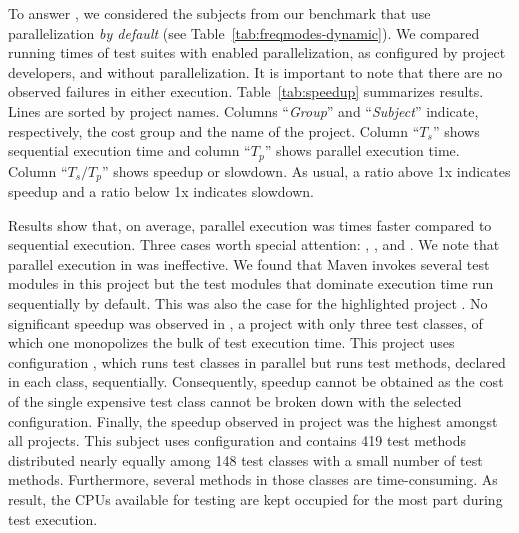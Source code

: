 \documentclass[10pt,journal,compsoc]{IEEEtran}
\begin{document}
To answer \numRQSpeedupOne{}, we considered the \numProjectsPar{}
subjects from our benchmark that use parallelization \emph{by default}
(see Table~\ref{tab:freqmodes-dynamic}).  We compared running times
of test suites with enabled parallelization, as configured by project
developers, and without parallelization. It is important to note that
there are no observed failures in either execution.
Table~\ref{tab:speedup} summarizes results.
Lines are sorted by project names.
Columns ``\emph{Group}'' and ``\emph{Subject}'' indicate, respectively,
the cost group and the name of the project.
Column ``$T_s$'' shows sequential execution time and column ``$T_p$''
shows parallel execution time.
Column ``$T_s/T_p$'' shows speedup or slowdown.
As usual, a ratio above 1x indicates speedup and a ratio below 1x
indicates slowdown.


Results show that, on average, parallel execution was
\avgSpeedup{} times faster compared to sequential execution.
Three cases worth special attention: , ,
and .
We note that parallel execution in  was
ineffective.  We found that Maven invokes several test modules in this
project but the test modules that dominate execution time run
sequentially by default. This was also the case for the highlighted
project .
No significant speedup was observed in , a project with
only three test classes, of which one monopolizes the bulk of test
execution time.
This project uses configuration \ParClassSeqMeth{}, which runs test
classes in parallel but runs test methods, declared in each class,
sequentially.
Consequently, speedup cannot be obtained as the cost of the single
expensive test class cannot be broken down with the selected
configuration.
Finally, the speedup observed in project  was
the highest amongst all projects. This subject uses configuration
\ParClassParMeth{} and contains 419 test methods distributed nearly
equally among 148 test classes with a small number of test methods.
Furthermore, several methods in those classes are time-consuming.
As result, the CPUs available for testing are kept occupied for the
most part during test execution.
\end{document}

